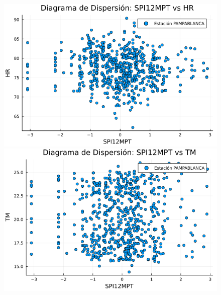 \begin{figure}[htbp]
\begin{minipage}{0.32\textwidth}
\end{minipage}

\vspace{0.5cm}  %

\begin{minipage}{0.32\textwidth}
    \centering
    \includegraphics[width=\linewidth]{Capitulos/Scaterplot/PAMPABLANCA_SPI12MPT_vs_HR.png}
\end{minipage}\hfill
\begin{minipage}{0.32\textwidth}
    \centering
    \includegraphics[width=\linewidth]{Capitulos/Scaterplot/PAMPABLANCA_SPI12MPT_vs_TM.png}
\end{minipage}\hfill
\begin{minipage}{0.32\textwidth}
    \centering

\end{minipage}
\end{figure}

